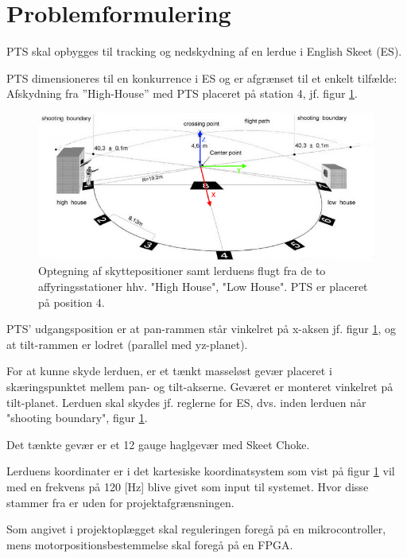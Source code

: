 \section{Problemformulering}
\label{sec:problemformulering}

PTS skal opbygges til tracking og nedskydning af en lerdue i English Skeet (ES).

PTS dimensioneres til en konkurrence i ES og er afgrænset til et enkelt tilfælde:
Afskydning fra ”High-House” med PTS placeret på station 4, jf. figur \ref{fig:ES}.
\begin{figure}[th!]
\centering
\includegraphics[width=1\textwidth]{./graphics/skeet_diagram_cropped_axes}
\caption[Skitse af ES]{Optegning af skyttepositioner samt lerduens flugt fra de to affyringsstationer hhv. "High House", "Low House". PTS er placeret på position 4.}
\label{fig:ES}
\end{figure}	
PTS' udgangsposition er at pan-rammen står vinkelret på x-aksen jf. figur \ref{fig:ES},
og at tilt-rammen er lodret (parallel med yz-planet).



For at kunne skyde lerduen, er et tænkt masseløst gevær placeret i skæringspunktet mellem pan- og tilt-akserne. Geværet er monteret vinkelret på tilt-planet. 
Lerduen skal skydes jf. reglerne for ES, dvs. inden lerduen når "shooting boundary", figur \ref{fig:ES}.

Det tænkte gevær er et 12 gauge haglgevær med Skeet Choke.

Lerduens koordinater er i det kartesiske koordinatsystem som vist på figur \ref{fig:ES}
vil med en frekvens på 120 [Hz] blive givet som input til systemet. 
Hvor disse stammer fra er uden for projektafgrænsningen. 

Som angivet i projektoplægget skal reguleringen foregå på en mikrocontroller,
mens motorpositionsbestemmelse skal foregå på en FPGA.